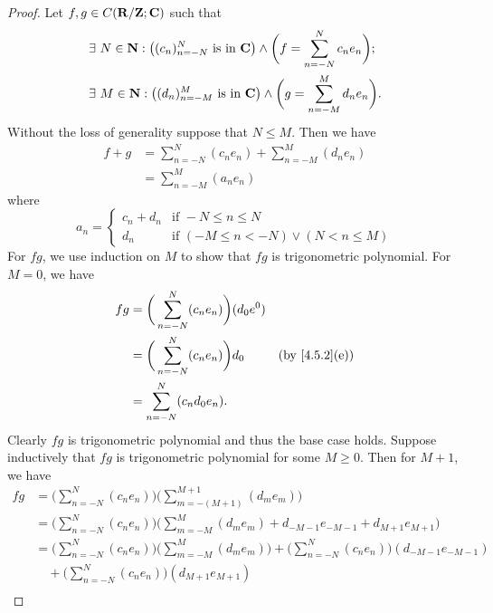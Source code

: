\begin{proof}
  Let \(f, g \in C(\mathbf{R} / \mathbf{Z} ; \mathbf{C})\) such that
  \begin{align*}
     & \exists\ N \in \mathbf{N} : \big((c_n)_{n = -N}^N \text{ is in } \mathbf{C}\big) \land \bigg(f = \sum_{n = -N}^N c_n e_n\bigg); \\
     & \exists\ M \in \mathbf{N} : \big((d_n)_{n = -M}^M \text{ is in } \mathbf{C}\big) \land \bigg(g = \sum_{n = -M}^M d_n e_n\bigg).
  \end{align*}
  Without the loss of generality suppose that \(N \leq M\).
  Then we have
  \begin{align*}
    f + g & = \sum_{n = -N}^N (c_n e_n) + \sum_{n = -M}^M (d_n e_n) \\
          & = \sum_{n = -M}^M (a_n e_n)
  \end{align*}
  where
  \[
    a_n = \begin{cases}
      c_n + d_n & \text{if } -N \leq n \leq N                     \\
      d_n       & \text{if } (-M \leq n < -N) \lor (N < n \leq M)
    \end{cases}
  \]
  For \(fg\), we use induction on \(M\) to show that \(fg\) is trigonometric polynomial.
  For \(M = 0\), we have
  \begin{align*}
    fg & = \bigg(\sum_{n = -N}^N (c_n e_n)\bigg) (d_0 e^0)                               \\
       & = \bigg(\sum_{n = -N}^N (c_n e_n)\bigg) d_0       & \text{(by \cref{4.5.2}(e))} \\
       & = \sum_{n = -N}^N (c_n d_0 e_n).
  \end{align*}
  Clearly \(fg\) is trigonometric polynomial and thus the base case holds.
  Suppose inductively that \(fg\) is trigonometric polynomial for some \(M \geq 0\).
  Then for \(M + 1\), we have
  \begin{align*}
    f g & = \bigg(\sum_{n = -N}^N (c_n e_n)\bigg) \bigg(\sum_{m = -(M + 1)}^{M + 1} (d_m e_m)\bigg)                                                        \\
        & = \bigg(\sum_{n = -N}^N (c_n e_n)\bigg) \bigg(\sum_{m = -M}^M (d_m e_m) + d_{-M - 1} e_{-M - 1} + d_{M + 1} e_{M + 1}\bigg)                      \\
        & = \bigg(\sum_{n = -N}^N (c_n e_n)\bigg) \bigg(\sum_{m = -M}^M (d_m e_m)\bigg) + \bigg(\sum_{n = -N}^N (c_n e_n)\bigg) (d_{-M - 1} e_{-M - 1})    \\
        & \quad + \bigg(\sum_{n = -N}^N (c_n e_n)\bigg) (d_{M + 1} e_{M + 1})                                                                              \\

\end{align*}
\end{proof}
